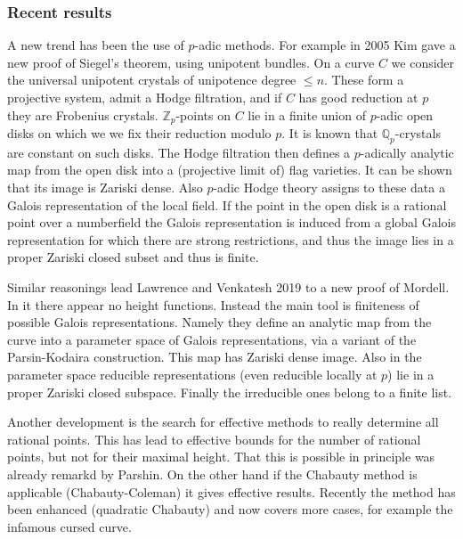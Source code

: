 \documentclass{beamer}
\begin{document}
\begin{frame}
\frametitle{Recent results}
A new trend has been the use of $p$-adic methods. For example in 2005 Kim gave a new proof of Siegel's theorem, using unipotent bundles. On a curve $C$ we consider the universal unipotent crystals of unipotence degree $\le n$. These form a projective system,  admit a Hodge filtration, and if $C$ has good reduction at $p$ they are Frobenius crystals. $\mathbb{Z}_p$-points on $C$ lie in a finite union of $p$-adic open disks on which we we fix their reduction modulo $p$. It is known that $\mathbb{Q}_p$-crystals are constant on such disks. The Hodge filtration then defines a $p$-adically analytic map from the open disk into a (projective limit of) flag varieties. It can be shown that its image is Zariski dense. Also $p$-adic Hodge theory assigns to these data a Galois representation of the local field. If the point in the open disk is a rational point over a numberfield the Galois representation is induced from a global Galois representation for which there are strong restrictions, and thus the image lies in a  proper Zariski closed subset and thus is finite.
\end{frame}
\begin{frame}

Similar reasonings lead Lawrence and Venkatesh  2019 to a new proof of Mordell.  In it there appear no height functions. Instead the main tool is finiteness of possible Galois representations. Namely they define an analytic map from the curve into a parameter space of Galois representations, via a variant of the Parsin-Kodaira construction. This map has Zariski dense image. Also in the parameter space reducible representations (even reducible locally at $p$) lie in a proper Zariski closed subspace.  Finally the irreducible ones belong to a finite list.

Another development is the search for effective methods to really determine all rational points. This has lead to effective bounds for the number of rational points, but not for their maximal height.  That this is possible in principle was already remarkd by Parshin. On the other hand if the Chabauty method is applicable (Chabauty-Coleman) it gives effective results. Recently the method has been enhanced (quadratic Chabauty) and now covers more cases, for example the infamous cursed curve.

\end{frame}
\end{document}
